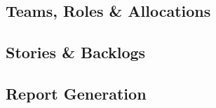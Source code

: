 \documentclass[11pt,fleqn]{book} %
\begin{document}
\subsection{Teams, Roles \& Allocations}
\subsection{Stories \& Backlogs}
\subsection{Report Generation}


%
%
%
%
%
\end{document}
